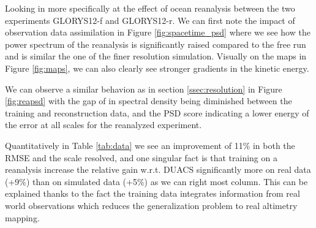 \documentclass[draft]{agujournal2019}
\begin{document}
Looking in more specifically at the effect of ocean reanalysis between the two experiments GLORYS12-f and GLORYS12-r. We can first note the impact of observation data assimilation in Figure \ref{fig:spacetime_psd} where we see how the power spectrum of the reanalysis is significantly raised compared to the free run and is similar the one of the finer resolution simulation. Visually on the maps in Figure \ref{fig:maps}, we can also clearly see stronger gradients in the kinetic energy.

We can observe a similar behavion as in section \ref{ssec:resolution} in Figure \ref{fig:reapsd} with the gap of in spectral density being diminished between the training and reconstruction data, and the PSD score indicating a lower energy of the error at all scales for the reanalyzed experiment.

Quantitatively in Table \ref{tab:data} we see an improvement of 11\% in both the RMSE and the scale resolved, and one singular fact is that training on a reanalysis increase the relative gain w.r.t. DUACS significantly more on real data (+9\%) than on simulated data (+5\%) as we can right most column. This can be explained thanks to the fact the training data integrates information from real world observations which reduces the generalization problem to real altimetry mapping.
\end{document}
